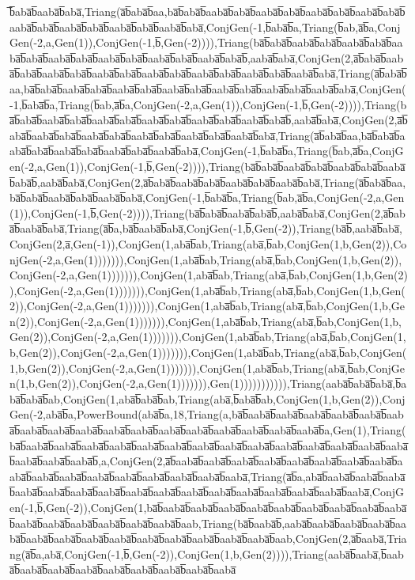 ̅b̅aba̅b̅aaba̅b̅aba̅,Triang(a̅b̅aba̅b̅aa,ba̅b̅aba̅b̅aaba̅b̅aba̅b̅aaba̅b̅aba̅b̅aaba̅b̅aba̅b̅aaba̅b̅aba̅b̅aaba̅b̅aba̅b̅aaba̅b̅aba̅b̅aaba̅b̅aba̅b̅aaba̅b̅aba̅,ConjGen(-1,b̅aba̅b̅a,Triang(b̅ab,a̅b̅a,ConjGen(-2,a,Gen(1)),ConjGen(-1,b̅,Gen(-2)))),Triang(ba̅b̅aba̅b̅aaba̅b̅aba̅b̅aaba̅b̅aba̅b̅aaba̅b̅aba̅b̅aaba̅b̅aba̅b̅aaba̅b̅aba̅b̅aaba̅b̅aba̅b̅aaba̅b̅aba̅b̅,aaba̅b̅aba̅,ConjGen(2,a̅b̅aba̅b̅aaba̅b̅aba̅b̅aaba̅b̅aba̅b̅aaba̅b̅aba̅b̅aaba̅b̅aba̅b̅aaba̅b̅aba̅b̅aaba̅b̅aba̅b̅aaba̅b̅aba̅,Triang(a̅b̅aba̅b̅aa,ba̅b̅aba̅b̅aaba̅b̅aba̅b̅aaba̅b̅aba̅b̅aaba̅b̅aba̅b̅aaba̅b̅aba̅b̅aaba̅b̅aba̅b̅aaba̅b̅aba̅,ConjGen(-1,b̅aba̅b̅a,Triang(b̅ab,a̅b̅a,ConjGen(-2,a,Gen(1)),ConjGen(-1,b̅,Gen(-2)))),Triang(ba̅b̅aba̅b̅aaba̅b̅aba̅b̅aaba̅b̅aba̅b̅aaba̅b̅aba̅b̅aaba̅b̅aba̅b̅aaba̅b̅aba̅b̅,aaba̅b̅aba̅,ConjGen(2,a̅b̅aba̅b̅aaba̅b̅aba̅b̅aaba̅b̅aba̅b̅aaba̅b̅aba̅b̅aaba̅b̅aba̅b̅aaba̅b̅aba̅,Triang(a̅b̅aba̅b̅aa,ba̅b̅aba̅b̅aaba̅b̅aba̅b̅aaba̅b̅aba̅b̅aaba̅b̅aba̅b̅aaba̅b̅aba̅,ConjGen(-1,b̅aba̅b̅a,Triang(b̅ab,a̅b̅a,ConjGen(-2,a,Gen(1)),ConjGen(-1,b̅,Gen(-2)))),Triang(ba̅b̅aba̅b̅aaba̅b̅aba̅b̅aaba̅b̅aba̅b̅aaba̅b̅aba̅b̅,aaba̅b̅aba̅,ConjGen(2,a̅b̅aba̅b̅aaba̅b̅aba̅b̅aaba̅b̅aba̅b̅aaba̅b̅aba̅,Triang(a̅b̅aba̅b̅aa,ba̅b̅aba̅b̅aaba̅b̅aba̅b̅aaba̅b̅aba̅,ConjGen(-1,b̅aba̅b̅a,Triang(b̅ab,a̅b̅a,ConjGen(-2,a,Gen(1)),ConjGen(-1,b̅,Gen(-2)))),Triang(ba̅b̅aba̅b̅aaba̅b̅aba̅b̅,aaba̅b̅aba̅,ConjGen(2,a̅b̅aba̅b̅aaba̅b̅aba̅,Triang(a̅b̅a,ba̅b̅aaba̅b̅aba̅,ConjGen(-1,b̅,Gen(-2)),Triang(ba̅b̅,aaba̅b̅aba̅,ConjGen(2,a̅,Gen(-1)),ConjGen(1,aba̅b̅ab,Triang(aba̅,b̅ab,ConjGen(1,b,Gen(2)),ConjGen(-2,a,Gen(1))))))),ConjGen(1,aba̅b̅ab,Triang(aba̅,b̅ab,ConjGen(1,b,Gen(2)),ConjGen(-2,a,Gen(1))))))),ConjGen(1,aba̅b̅ab,Triang(aba̅,b̅ab,ConjGen(1,b,Gen(2)),ConjGen(-2,a,Gen(1))))))),ConjGen(1,aba̅b̅ab,Triang(aba̅,b̅ab,ConjGen(1,b,Gen(2)),ConjGen(-2,a,Gen(1))))))),ConjGen(1,aba̅b̅ab,Triang(aba̅,b̅ab,ConjGen(1,b,Gen(2)),ConjGen(-2,a,Gen(1))))))),ConjGen(1,aba̅b̅ab,Triang(aba̅,b̅ab,ConjGen(1,b,Gen(2)),ConjGen(-2,a,Gen(1))))))),ConjGen(1,aba̅b̅ab,Triang(aba̅,b̅ab,ConjGen(1,b,Gen(2)),ConjGen(-2,a,Gen(1))))))),ConjGen(1,aba̅b̅ab,Triang(aba̅,b̅ab,ConjGen(1,b,Gen(2)),ConjGen(-2,a,Gen(1))))))),ConjGen(1,aba̅b̅ab,Triang(aba̅,b̅ab,ConjGen(1,b,Gen(2)),ConjGen(-2,a,Gen(1))))))),Gen(1))))))))))),Triang(aaba̅b̅aba̅b̅aba̅,b̅aba̅b̅aba̅b̅ab,ConjGen(1,aba̅b̅aba̅b̅ab,Triang(aba̅,b̅aba̅b̅ab,ConjGen(1,b,Gen(2)),ConjGen(-2,aba̅b̅a,PowerBound(aba̅b̅a,18,Triang(a,ba̅b̅aaba̅b̅aaba̅b̅aaba̅b̅aaba̅b̅aaba̅b̅aaba̅b̅aaba̅b̅aaba̅b̅aaba̅b̅aaba̅b̅aaba̅b̅aaba̅b̅aaba̅b̅aaba̅b̅aaba̅b̅aaba̅b̅aaba̅b̅a,Gen(1),Triang(ba̅b̅aaba̅b̅aaba̅b̅aaba̅b̅aaba̅b̅aaba̅b̅aaba̅b̅aaba̅b̅aaba̅b̅aaba̅b̅aaba̅b̅aaba̅b̅aaba̅b̅aaba̅b̅aaba̅b̅aaba̅b̅aaba̅b̅aaba̅b̅,a,ConjGen(2,a̅b̅aaba̅b̅aaba̅b̅aaba̅b̅aaba̅b̅aaba̅b̅aaba̅b̅aaba̅b̅aaba̅b̅aaba̅b̅aaba̅b̅aaba̅b̅aaba̅b̅aaba̅b̅aaba̅b̅aaba̅b̅aaba̅b̅aaba̅,Triang(a̅b̅a,aba̅b̅aaba̅b̅aaba̅b̅aaba̅b̅aaba̅b̅aaba̅b̅aaba̅b̅aaba̅b̅aaba̅b̅aaba̅b̅aaba̅b̅aaba̅b̅aaba̅b̅aaba̅b̅aaba̅b̅aaba̅b̅aaba̅,ConjGen(-1,b̅,Gen(-2)),ConjGen(1,ba̅b̅aaba̅b̅aaba̅b̅aaba̅b̅aaba̅b̅aaba̅b̅aaba̅b̅aaba̅b̅aaba̅b̅aaba̅b̅aaba̅b̅aaba̅b̅aaba̅b̅aaba̅b̅aaba̅b̅aaba̅b̅aab,Triang(ba̅b̅aaba̅b̅,aaba̅b̅aaba̅b̅aaba̅b̅aaba̅b̅aaba̅b̅aaba̅b̅aaba̅b̅aaba̅b̅aaba̅b̅aaba̅b̅aaba̅b̅aaba̅b̅aaba̅b̅aaba̅b̅aab,ConjGen(2,a̅b̅aaba̅,Triang(a̅b̅a,aba̅,ConjGen(-1,b̅,Gen(-2)),ConjGen(1,b,Gen(2)))),Triang(aaba̅b̅aaba̅,b̅aaba̅b̅aaba̅b̅aaba̅b̅aaba̅b̅aaba̅b̅aaba̅b̅aaba̅b̅aaba̅b̅aaba̅
